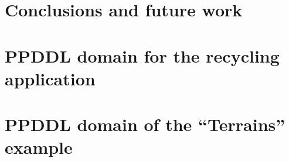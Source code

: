 \documentclass[11pt,a4paper,oldfontcommands,oneside]{memoir}
\begin{document}
\chapter{Conclusions and future work}
\label{chap:conclusions}


\printbibliography

\begin{appendices}
\chapter{PPDDL domain for the recycling application}
\label{chap:ppddl-model}

\chapter{PPDDL domain of the ``Terrains'' example}
\label{chap:terrains-model}

\end{appendices}
\end{document}
